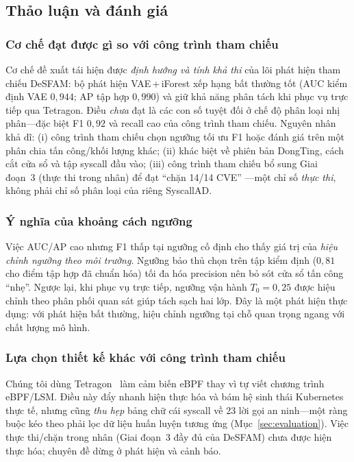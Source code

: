 \subsection{Thảo luận và đánh giá}
\label{sec:discussion}

\subsubsection{Cơ chế đạt được gì so với công trình tham chiếu}
Cơ chế đề xuất tái hiện được \emph{định hướng và tính khả thi} của lõi phát hiện
tham chiếu DeSFAM: bộ phát hiện VAE\,+\,iForest xếp hạng bất thường tốt (AUC kiểm
định VAE $0{,}944$; AP tập hợp $0{,}990$) và giữ khả năng phân tách khi phục vụ
trực tiếp qua Tetragon. Điều \emph{chưa} đạt là các con số tuyệt đối ở chế độ phân
loại nhị phân---đặc biệt F1 $0{,}92$ và recall cao của công trình tham chiếu. Nguyên nhân khả dĩ:
(i) công trình tham chiếu
chọn ngưỡng tối ưu F1 hoặc đánh giá trên một phân chia tấn công/khối lượng khác;
(ii) khác biệt về phiên bản DongTing, cách cắt cửa sổ và tập syscall đầu vào;
(iii) công trình tham chiếu bổ sung Giai đoạn~3 (thực thi trong nhân) để đạt ``chặn 14/14 CVE''
---một chỉ số \emph{thực thi}, không phải chỉ số phân loại của riêng SyscallAD.

\subsubsection{Ý nghĩa của khoảng cách ngưỡng}
Việc AUC/AP cao nhưng F1 thấp tại ngưỡng cố định cho thấy giá trị của \emph{hiệu
chỉnh ngưỡng theo môi trường}. Ngưỡng bảo thủ chọn trên tập kiểm định ($0{,}81$
cho điểm tập hợp đã chuẩn hóa) tối đa hóa precision nên bỏ sót cửa sổ tấn công
``nhẹ''. Ngược lại, khi phục vụ trực tiếp, ngưỡng vận hành $T_0=0{,}25$ được hiệu
chỉnh theo phân phối quan sát giúp tách sạch hai lớp. Đây là một phát hiện thực
dụng: với phát hiện bất thường, hiệu chỉnh ngưỡng tại chỗ quan trọng ngang với
chất lượng mô hình.

\subsubsection{Lựa chọn thiết kế khác với công trình tham chiếu}
Chúng tôi dùng Tetragon~\cite{tetragon} làm cảm biến eBPF thay vì tự viết chương
trình eBPF/LSM. Điều này đẩy nhanh hiện thực hóa và bám hệ sinh thái Kubernetes
thực tế, nhưng cũng \emph{thu hẹp} bảng chữ cái syscall về 23 lời gọi an ninh---một
ràng buộc kéo theo phải lọc dữ liệu huấn luyện tương ứng
(Mục~\ref{sec:evaluation}). Việc thực thi/chặn trong nhân (Giai đoạn~3 đầy đủ của
DeSFAM) chưa được hiện
thực hóa; chuyên đề dừng ở phát hiện và cảnh báo.

